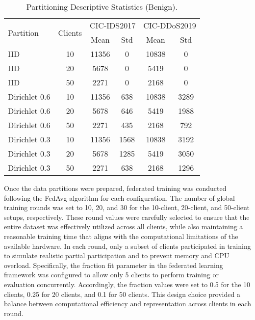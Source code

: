 \begin{table}[h]
    \caption{Partitioning Descriptive Statistics (Benign).}
    \centering
    \begin{tabular}{l|c|c|c|c|c}
        \multirow{2}{*}{Partition} & \multirow{2}{*}{Clients} & \multicolumn{2}{|c|}{CIC-IDS2017} & \multicolumn{2}{|c}{CIC-DDoS2019} \\
        \cline{3-6} & & Mean & Std & Mean & Std \\
        \hline\hline
        IID & 10 & 11356 & 0 & 10838 & 0 \\
        IID & 20 & 5678 & 0 & 5419 & 0 \\
        IID & 50 & 2271 & 0 & 2168 & 0 \\
        Dirichlet 0.6 & 10 & 11356 & 638 & 10838 & 3289 \\
        Dirichlet 0.6 & 20 & 5678 & 646 & 5419 & 1988 \\
        Dirichlet 0.6 & 50 & 2271 & 435 & 2168 & 792 \\
        Dirichlet 0.3 & 10 & 11356 & 1568 & 10838 & 3192 \\
        Dirichlet 0.3 & 20 & 5678 & 1285 & 5419 & 3050 \\
        Dirichlet 0.3 & 50 & 2271 & 638 & 2168 & 1296 \\
    \end{tabular}
    \label{tbl:partition_descriptive}
\end{table}

Once the data partitions were prepared, federated training was conducted following the FedAvg algorithm for each configuration. The number of global training rounds was set to 10, 20, and 30 for the 10-client, 20-client, and 50-client setups, respectively. These round values were carefully selected to ensure that the entire dataset was effectively utilized across all clients, while also maintaining a reasonable training time that aligns with the computational limitations of the available hardware. In each round, only a subset of clients participated in training to simulate realistic partial participation and to prevent memory and CPU overload. Specifically, the fraction fit parameter in the federated learning framework was configured to allow only 5 clients to perform training or evaluation concurrently. Accordingly, the fraction values were set to 0.5 for the 10 clients, 0.25 for 20 clients, and 0.1 for 50 clients. This design choice provided a balance between computational efficiency and representation across clients in each round.

